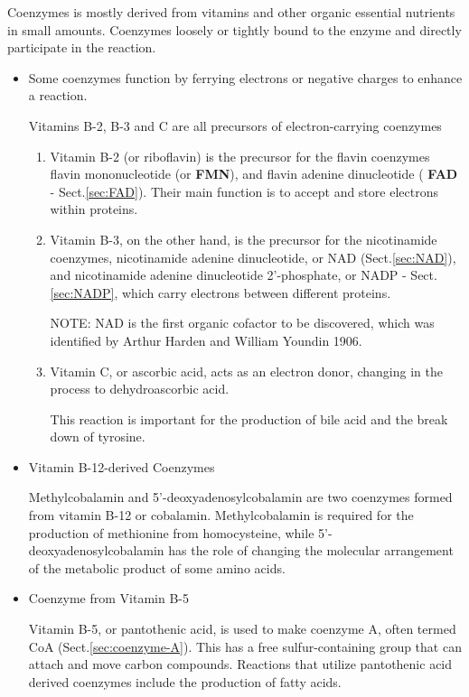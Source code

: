 Coenzymes is mostly derived from vitamins and other organic essential nutrients
in small amounts.  Coenzymes loosely or tightly bound to the enzyme and directly
participate in the reaction. 
\begin{itemize}
  \item  Some coenzymes function by ferrying electrons or negative charges to
  enhance a reaction. 

Vitamins B-2, B-3 and C are all precursors of
electron-carrying coenzymes
\begin{enumerate}
  
  \item  Vitamin B-2 (or riboflavin) is the precursor for the flavin coenzymes
flavin mononucleotide (or {\bf FMN}), and flavin adenine dinucleotide ({\bf
FAD} - Sect.\ref{sec:FAD}). Their main function is to accept and store
electrons within proteins.

  \item Vitamin B-3, on the other hand, is the precursor for the nicotinamide
  coenzymes, nicotinamide adenine dinucleotide, or NAD (Sect.\ref{sec:NAD}), and
  nicotinamide adenine dinucleotide 2'-phosphate, or NADP - Sect.\ref{sec:NADP},
  which carry electrons between different proteins.

NOTE: NAD is the first organic cofactor to be discovered, which was identified
by Arthur Harden and William Youndin 1906.
  
  \item  Vitamin C, or ascorbic acid, acts as an electron donor, changing in the
  process to dehydroascorbic acid.
  
  This reaction is important for the production of bile acid and the break down
  of tyrosine.
\end{enumerate}

  \item Vitamin B-12-derived Coenzymes
  
Methylcobalamin and 5'-deoxyadenosylcobalamin are two coenzymes formed from
vitamin B-12 or cobalamin. Methylcobalamin is required for the production of
methionine from homocysteine, while 5'-deoxyadenosylcobalamin has the role of
changing the molecular arrangement of the metabolic product of some amino acids.

  \item Coenzyme from Vitamin B-5

Vitamin B-5, or pantothenic acid, is used to make coenzyme A, often termed CoA
(Sect.\ref{sec:coenzyme-A}).
This has a free sulfur-containing group that can attach and move carbon
compounds. Reactions that utilize pantothenic acid derived coenzymes include the
production of fatty acids.   


\end{itemize}
